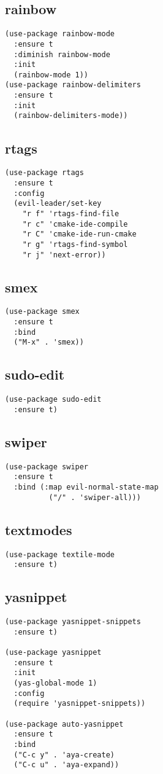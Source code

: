 \documentclass[11pt]{article}
\begin{document}
\subsection{rainbow}
\label{sec-2-28}
\begin{verbatim}
(use-package rainbow-mode
  :ensure t
  :diminish rainbow-mode
  :init
  (rainbow-mode 1))
(use-package rainbow-delimiters
  :ensure t
  :init
  (rainbow-delimiters-mode))
\end{verbatim}
\subsection{rtags}
\label{sec-2-29}
\begin{verbatim}
(use-package rtags
  :ensure t
  :config
  (evil-leader/set-key
    "r f" 'rtags-find-file
    "r c" 'cmake-ide-compile
    "r C" 'cmake-ide-run-cmake
    "r g" 'rtags-find-symbol
    "r j" 'next-error))
\end{verbatim}
\subsection{smex}
\label{sec-2-30}
\begin{verbatim}
(use-package smex
  :ensure t
  :bind
  ("M-x" . 'smex))
\end{verbatim}
\subsection{sudo-edit}
\label{sec-2-31}
\begin{verbatim}
(use-package sudo-edit
  :ensure t)
\end{verbatim}
\subsection{swiper}
\label{sec-2-32}
\begin{verbatim}
(use-package swiper
  :ensure t
  :bind (:map evil-normal-state-map
	      ("/" . 'swiper-all)))
\end{verbatim}

\subsection{textmodes}
\label{sec-2-33}
\begin{verbatim}
(use-package textile-mode
  :ensure t)
\end{verbatim}
\subsection{yasnippet}
\label{sec-2-34}
\begin{verbatim}
(use-package yasnippet-snippets
  :ensure t)

(use-package yasnippet
  :ensure t
  :init
  (yas-global-mode 1)
  :config
  (require 'yasnippet-snippets))

(use-package auto-yasnippet
  :ensure t
  :bind
  ("C-c y" . 'aya-create)
  ("C-c u" . 'aya-expand))
\end{verbatim}
\end{document}
